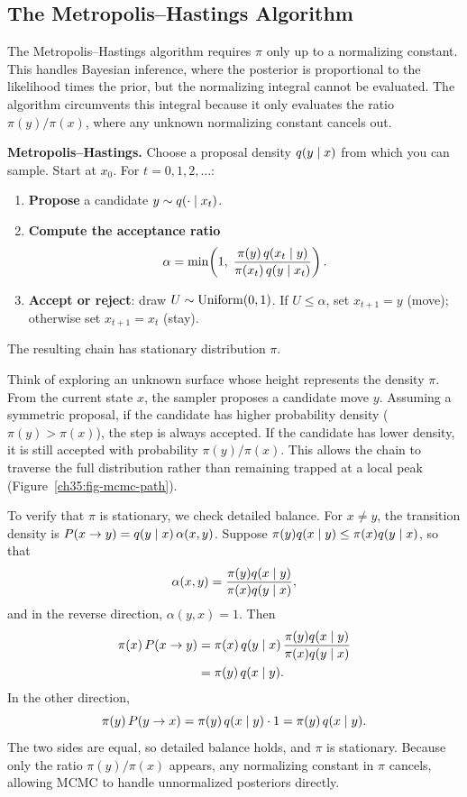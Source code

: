 \subsection{The Metropolis--Hastings Algorithm}
\label{ch35:metropolis}
The Metropolis--Hastings algorithm requires $\pi$ only up to a normalizing constant.
This handles Bayesian inference, where the posterior is proportional to
the likelihood times the prior, but the normalizing integral cannot be evaluated. The algorithm
circumvents this integral because it only evaluates the ratio
$\pi(y)/\pi(x)$, where any unknown normalizing constant cancels out.
\begin{formalbox}
\textbf{Metropolis--Hastings.} Choose a proposal density $q(y \mid x)$ from
which you can sample. Start at $x_0$. For $t = 0, 1, 2, \dots$:
\begin{enumerate}
  \item \textbf{Propose} a candidate $y \sim q(\cdot \mid x_t)$.
  \item \textbf{Compute the acceptance ratio}
        \[
          \alpha = \min\!\left(1,\;
          \frac{\pi(y)\, q(x_t \mid y)}{\pi(x_t)\, q(y \mid x_t)}\right).
        \]
  \item \textbf{Accept or reject}: draw $U \sim \operatorname{Uniform}(0,1)$. If $U \le \alpha$,
        set $x_{t+1} = y$ (move); otherwise set $x_{t+1} = x_t$ (stay).
\end{enumerate}
The resulting chain has stationary distribution $\pi$.
\end{formalbox}
\begin{intuitionbox}
Think of exploring an unknown surface whose height represents the density $\pi$. From the
current state $x$, the sampler proposes a candidate move $y$. Assuming a symmetric proposal, if the candidate has higher
probability density ($\pi(y) > \pi(x)$), the step is always accepted. If the candidate
has lower density, it is still accepted with probability $\pi(y)/\pi(x)$. This allows the chain
to traverse the full distribution rather than remaining trapped at a local peak
(Figure~\ref{ch35:fig-mcmc-path}).
\end{intuitionbox}
\begin{whybox}
To verify that $\pi$ is stationary, we check detailed balance. For $x \ne y$,
the transition density is $P(x\to y) = q(y\mid x)\,\alpha(x,y)$. Suppose
$\pi(y)q(x\mid y) \le \pi(x)q(y\mid x)$, so that
\[
  \alpha(x,y) = \frac{\pi(y)q(x\mid y)}{\pi(x)q(y\mid x)},
\]
and in the reverse direction, $\alpha(y,x) = 1$. Then
\begin{align*}
  \pi(x)\,P(x\to y) &= \pi(x)\,q(y\mid x)\, \frac{\pi(y)q(x\mid y)}{\pi(x)q(y\mid x)} \\
   &= \pi(y)\,q(x\mid y).
\end{align*}
In the other direction,
\[
  \pi(y)\,P(y\to x) = \pi(y)\,q(x\mid y)\cdot 1 = \pi(y)\,q(x\mid y).
\]
The two sides are equal, so detailed balance holds, and $\pi$ is stationary.
Because only the ratio $\pi(y)/\pi(x)$ appears, any normalizing constant in $\pi$
cancels, allowing MCMC to handle unnormalized posteriors directly.
\end{whybox}
